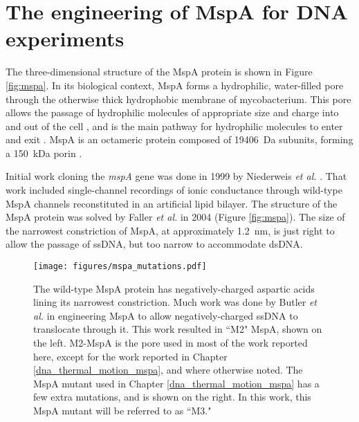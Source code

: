 \section{The engineering of MspA for DNA experiments}

The three-dimensional structure of the MspA protein is shown in Figure \ref{fig:mspa}.  In its biological context, MspA forms a hydrophilic, water-filled pore through the otherwise thick hydrophobic membrane of mycobacterium.  This pore allows the passage of hydrophilic molecules of appropriate size and charge into and out of the cell \citep{Niederweis1999}, and is the main pathway for hydrophilic molecules to enter and exit \citep{Stahl2001}.  MspA is an octameric protein composed of \SI{19406}{\dalton} subunits, forming a \SI{150}{\kilo\dalton} porin \citep{Niederweis1999}.

Initial work cloning the \textit{mspA} gene was done in 1999 by Niederweis \textit{et al.} \citep{Niederweis1999}.  That work  included single-channel recordings of ionic conductance through wild-type MspA channels reconstituted in an artificial lipid bilayer.  The structure of the MspA protein was solved by Faller \textit{et al.} in 2004 \citep{Faller2004} (Figure \ref{fig:mspa}).  The size of the narrowest constriction of MspA, at approximately \SI{1.2}{\nm}, is just right to allow the passage of ssDNA, but too narrow to accommodate dsDNA.

\begin{figure}[h]
\begin{centering}
\texttt{[image: figures/mspa\_mutations.pdf]}
\caption[Genetic engineering of MspA]{The wild-type MspA protein has negatively-charged aspartic acids lining its narrowest constriction.  Much work was done by Butler \textit{et al.} \citep{Butler2008} in engineering MspA to allow negatively-charged ssDNA to translocate through it.  This work resulted in ``M2" MspA, shown on the left.  M2-MspA is the pore used in most of the work reported here, except for the work reported in Chapter \ref{dna_thermal_motion_mspa}, and where otherwise noted.  The MspA mutant used in Chapter \ref{dna_thermal_motion_mspa} has a few extra mutations, and is shown on the right.  In this work, this MspA mutant will be referred to as ``M3."}
\label{fig:mspa_engineering}
\end{centering}
\end{figure}

